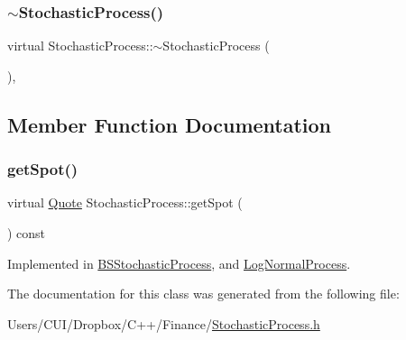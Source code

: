 \subsubsection{\texorpdfstring{$\sim$\+Stochastic\+Process()}{~StochasticProcess()}}
{\footnotesize\ttfamily virtual Stochastic\+Process\+::$\sim$\+Stochastic\+Process (\begin{DoxyParamCaption}{ }\end{DoxyParamCaption})\hspace{0.3cm}{\ttfamily [inline]}, {\ttfamily [virtual]}}



\subsection{Member Function Documentation}
\hypertarget{class_stochastic_process_aad2ef51ca4bc2fe5f33a73e8f0ee361e}{}\label{class_stochastic_process_aad2ef51ca4bc2fe5f33a73e8f0ee361e} 
\subsubsection{\texorpdfstring{get\+Spot()}{getSpot()}}
{\footnotesize\ttfamily virtual \hyperlink{_name_def_8h_a642a6c5fd87319d922637de0e0bb0305}{Quote} Stochastic\+Process\+::get\+Spot (\begin{DoxyParamCaption}{ }\end{DoxyParamCaption}) const\hspace{0.3cm}{\ttfamily [pure virtual]}}



Implemented in \hyperlink{class_b_s_stochastic_process_a604f867d372fc55a6dfae456f56604ea}{B\+S\+Stochastic\+Process}, and \hyperlink{class_log_normal_process_a3732c44145aa35d1e2000cc0140bfb03}{Log\+Normal\+Process}.



The documentation for this class was generated from the following file\+:\begin{DoxyCompactItemize}
\item 
Users/\+C\+U\+I/\+Dropbox/\+C++/\+Finance/\hyperlink{_stochastic_process_8h}{Stochastic\+Process.\+h}\end{DoxyCompactItemize}
